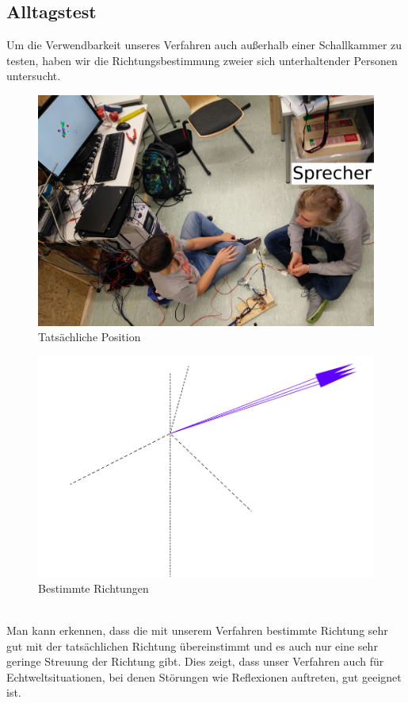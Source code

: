 \subsection{Alltagstest}
Um die Verwendbarkeit unseres Verfahren auch außerhalb einer Schallkammer zu testen, haben wir die Richtungsbestimmung zweier sich unterhaltender Personen untersucht.\\
\begin{minipage}{0.49\linewidth}
	\begin{figure}[H]
		\centering
		\includegraphics[width=\textwidth]{img/real_real}
		\caption{Tatsächliche Position}
		\label{fig:real_real}
	\end{figure}
\end{minipage}\hfill
\begin{minipage}{0.49\linewidth}
   \begin{figure}[H]
   	\hfill
   	\centering
   	\includegraphics[width=\textwidth]{img/real_data.png}
   	\caption{Bestimmte Richtungen}
   	\label{fig:real_real_data}
   \end{figure}
\end{minipage}
\vspace{10pt}
\\
Man kann erkennen, dass die mit unserem Verfahren bestimmte Richtung sehr gut mit der tatsächlichen Richtung übereinstimmt und es auch nur eine sehr geringe Streuung der Richtung gibt. Dies zeigt, dass unser Verfahren auch für Echtweltsituationen, bei denen Störungen wie Reflexionen auftreten, gut geeignet ist.
